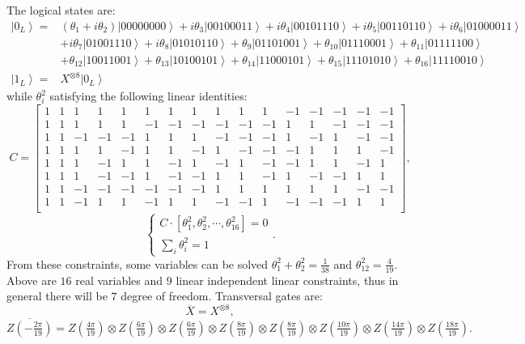\documentclass[8pt]{article}
\theoremstyle{definition}
\begin{document}
The logical states are:
\begin{align*}
    \left|0_{L}\right\rangle = & \left(\theta_{1}+i\theta_{2}\right)\left|00000000\right\rangle +i\theta_{3}\left|00100011\right\rangle +i\theta_{4}\left|00101110\right\rangle +i\theta_{5}\left|00110110\right\rangle +i\theta_{6}\left|01000011\right\rangle \\&+i\theta_{7}\left|01001110\right\rangle +i\theta_{8}\left|01010110\right\rangle +\theta_{9}\left|01101001\right\rangle +\theta_{10}\left|01110001\right\rangle +\theta_{11}\left|01111100\right\rangle \\&+\theta_{12}\left|10011001\right\rangle +\theta_{13}\left|10100101\right\rangle +\theta_{14}\left|11000101\right\rangle +\theta_{15}\left|11101010\right\rangle +\theta_{16}\left|11110010\right\rangle \\
    \left|1_{L}\right\rangle = & X^{\otimes8}\left|0_{L}\right\rangle
\end{align*}
while $\theta_i^2$ satisfying the following linear identities:
\begingroup
\setcounter{MaxMatrixCols}{20} %
\[ C=\begin{bmatrix}
        1 & 1 & 1  & 1  & 1  & 1  & 1  & 1  & 1  & 1  & 1  & -1 & -1 & -1 & -1 & -1 \\
        1 & 1 & 1  & 1  & 1  & -1 & -1 & -1 & -1 & -1 & -1 & 1  & 1  & -1 & -1 & -1 \\
        1 & 1 & -1 & -1 & -1 & 1  & 1  & 1  & -1 & -1 & -1 & 1  & -1 & 1  & -1 & -1 \\
        1 & 1 & 1  & 1  & -1 & 1  & 1  & -1 & 1  & -1 & -1 & -1 & 1  & 1  & 1  & -1 \\
        1 & 1 & 1  & -1 & 1  & 1  & -1 & 1  & -1 & 1  & -1 & -1 & 1  & 1  & -1 & 1  \\
        1 & 1 & 1  & -1 & -1 & 1  & -1 & -1 & 1  & 1  & -1 & 1  & -1 & -1 & 1  & 1  \\
        1 & 1 & -1 & -1 & -1 & -1 & -1 & -1 & 1  & 1  & 1  & 1  & 1  & 1  & -1 & -1 \\
        1 & 1 & -1 & 1  & 1  & -1 & 1  & 1  & -1 & -1 & 1  & -1 & -1 & -1 & 1  & 1  \\
    \end{bmatrix}, \]
\endgroup
\[ \begin{cases}
        C\cdot\left[\theta_{1}^{2},\theta_{2}^{2},\cdots,\theta_{16}^{2}\right]=0 \\
        \sum_{i}\theta_{i}^{2}=1
    \end{cases}.\]
From these constraints, some variables can be solved $\theta_1^2+\theta_2^2=\frac{1}{38}$ and $\theta_{12}^2=\frac{4}{19}$. Above are $16$ real variables and $9$ linear independent linear constraints, thus in general there will be $7$ degree of freedom. Transversal gates are:
\[ \overline{X}=X^{\otimes8}, \]
\[ \overline{Z\left(-\tfrac{2\pi}{19}\right)}=Z\left(\tfrac{4\pi}{19}\right)\otimes Z\left(\tfrac{6\pi}{19}\right)\otimes Z\left(\tfrac{6\pi}{19}\right)\otimes Z\left(\tfrac{8\pi}{19}\right)\otimes Z\left(\tfrac{8\pi}{19}\right)\otimes Z\left(\tfrac{10\pi}{19}\right)\otimes Z\left(\tfrac{14\pi}{19}\right)\otimes Z\left(\tfrac{18\pi}{19}\right).\]
\end{document}
